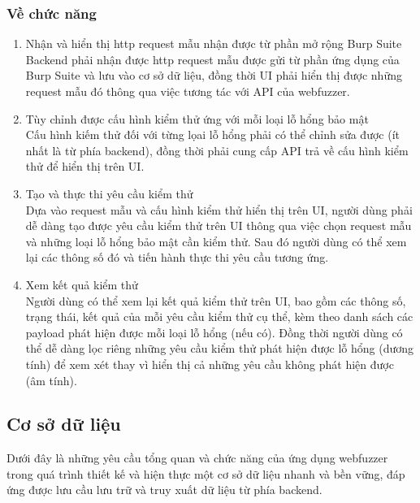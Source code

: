 \subsubsection{Về chức năng}
\begin{enumerate}
    \item Nhận và hiển thị \acrshort{http} request mẫu nhận được từ phần mở rộng Burp Suite\\
    Backend phải nhận được \acrshort{http} request mẫu được gửi từ phần ứng dụng của Burp Suite và lưu vào cơ sở dữ liệu, đồng thời UI phải hiển thị được những request mẫu đó thông qua việc tương tác với API của webfuzzer.
    \item Tùy chỉnh được cấu hình kiểm thử ứng với mỗi loại lỗ hổng bảo mật\\
    Cấu hình kiếm thử đối với từng lọai lỗ hổng phải có thể chỉnh sửa được (ít nhất là từ phía backend), đồng thời phải cung cấp API trả về cấu hình kiểm thử để hiển thị trên UI.
    \item Tạo và thực thi yêu cầu kiểm thử\\
    Dựa vào request mẫu và cấu hình kiểm thử hiển thị trên UI, người dùng phải dễ dàng tạo được yêu cầu kiểm thử trên UI thông qua việc chọn request mẫu và những loại lỗ hổng bảo mật cần kiểm thử. Sau đó người dùng có thể xem lại các thông số đó và tiến hành thực thi yêu cầu tương ứng.
    \item Xem kết quả kiểm thử\\
    Người dùng có thể xem lại kết quả kiểm thử trên UI, bao gồm các thông số, trạng thái, kết quả của mỗi yêu cầu kiểm thử cụ thể, kèm theo danh sách các payload phát hiện được mỗi loại lỗ hổng (nếu có). Đồng thời người dùng có thể dễ dàng lọc riêng những yêu cầu kiểm thử phát hiện được lỗ hổng (dương tính) để xem xét thay vì hiển thị cả những yêu cầu không phát hiện được (âm tính).
\end{enumerate}
\subsection{Cơ sở dữ liệu}
Dưới đây là những yêu cầu tổng quan và chức năng của ứng dụng webfuzzer trong quá trình thiết kế và hiện thực một cơ sở dữ liệu nhanh và bền vững, đáp ứng được lưu cầu lưu trữ và truy xuất dữ liệu từ phía backend.
